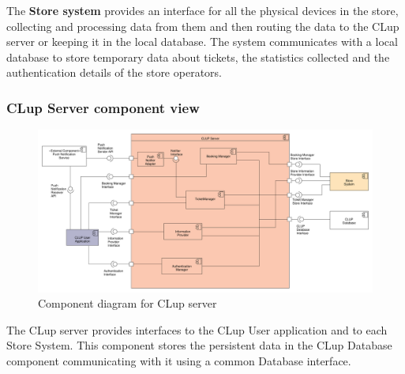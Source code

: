 The \textbf{Store system} provides an interface for all the physical devices in the store, collecting and processing data from them and then routing the data to the CLup server or keeping it in the local database. The system communicates with a local database to store temporary data about tickets, the statistics collected and the authentication details of the store operators.

\subsubsection{CLup Server component view}
\begin{figure}[H]
    \includegraphics[width=\textwidth]{Images/UML_server_component.pdf}
    \caption{\label{fig:UML_comp_Clup_server}Component diagram for CLup server}
\end{figure}

The CLup server provides interfaces to the CLup User application and to each Store System. This component stores the persistent data in the CLup Database component communicating with it using a common Database interface.

